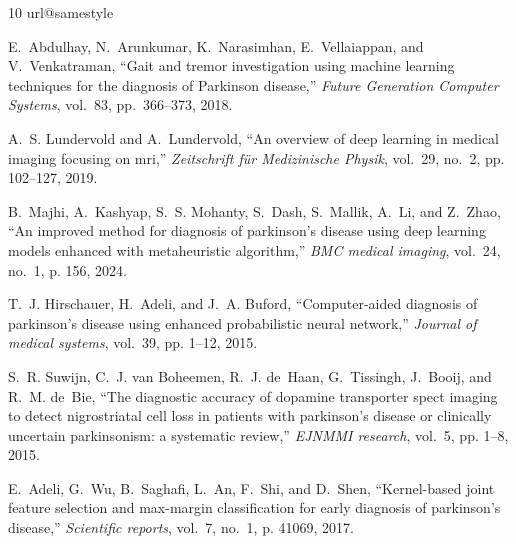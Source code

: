 \documentclass[twocolumn]{article}
\begin{document}
\begin{thebibliography}{10}
\setlength{\itemsep}{0.2em}
\setlength{\parskip}{0pt}
\providecommand{\url}[1]{#1}
\csname url@samestyle\endcsname
\providecommand{\newblock}{\relax}
\providecommand{\bibinfo}[2]{#2}
\providecommand{\BIBentrySTDinterwordspacing}{\spaceskip=0pt\relax}
\providecommand{\BIBentryALTinterwordstretchfactor}{4}
\providecommand{\BIBentryALTinterwordspacing}{\spaceskip=\fontdimen2\font plus
\BIBentryALTinterwordstretchfactor\fontdimen3\font minus
  \fontdimen4\font\relax}
\providecommand{\BIBforeignlanguage}[2]{{%
\expandafter\ifx\csname l@#1\endcsname\relax
\typeout{** WARNING: IEEEtran.bst: No hyphenation pattern has been}%
\typeout{** loaded for the language `#1'. Using the pattern for}%
\typeout{** the default language instead.}%
\else
\language=\csname l@#1\endcsname
\fi
#2}}
\providecommand{\BIBdecl}{\relax}
\BIBdecl

E.~Abdulhay, N.~Arunkumar, K.~Narasimhan, E.~Vellaiappan, and V.~Venkatraman,
``Gait and tremor investigation using machine learning techniques for the diagnosis of Parkinson disease,''
\emph{Future Generation Computer Systems}, vol.~83, pp.~366--373, 2018.

A.~S. Lundervold and A.~Lundervold, ``An overview of deep learning in medical
  imaging focusing on mri,'' \emph{Zeitschrift f{\"u}r Medizinische Physik},
  vol.~29, no.~2, pp. 102--127, 2019.

B.~Majhi, A.~Kashyap, S.~S. Mohanty, S.~Dash, S.~Mallik, A.~Li, and Z.~Zhao,
  ``An improved method for diagnosis of parkinson’s disease using deep
  learning models enhanced with metaheuristic algorithm,'' \emph{BMC medical
  imaging}, vol.~24, no.~1, p. 156, 2024.

T.~J. Hirschauer, H.~Adeli, and J.~A. Buford, ``Computer-aided diagnosis of
  parkinson’s disease using enhanced probabilistic neural network,''
  \emph{Journal of medical systems}, vol.~39, pp. 1--12, 2015.

S.~R. Suwijn, C.~J. van Boheemen, R.~J. de~Haan, G.~Tissingh, J.~Booij, and
  R.~M. de~Bie, ``The diagnostic accuracy of dopamine transporter spect imaging
  to detect nigrostriatal cell loss in patients with parkinson’s disease or
  clinically uncertain parkinsonism: a systematic review,'' \emph{EJNMMI
  research}, vol.~5, pp. 1--8, 2015.

E.~Adeli, G.~Wu, B.~Saghafi, L.~An, F.~Shi, and D.~Shen, ``Kernel-based joint
  feature selection and max-margin classification for early diagnosis of
  parkinson’s disease,'' \emph{Scientific reports}, vol.~7, no.~1, p. 41069,
  2017.


\end{thebibliography}
\end{document}
